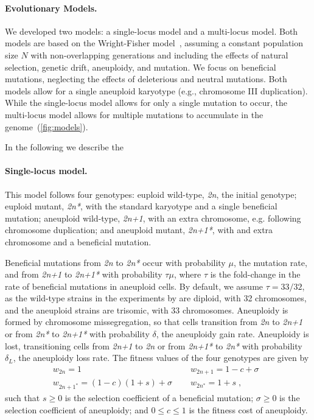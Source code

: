 \documentclass[12pt]{extarticle}
\newcommand{\euwt}{\emph{2n}}
\newcommand{\anwt}{\emph{2n+1}}
\newcommand{\eumt}{\emph{2n*}}
\newcommand{\anmt}{\emph{2n+1*}}
\begin{document}
\paragraph*{Evolutionary Models.}
We developed two models: a single-locus model and a multi-locus model. 
Both models are based on the Wright-Fisher model~\citep{Otto2007}, assuming a constant population size $N$ with non-overlapping generations and including the effects of natural selection, genetic drift, aneuploidy, and mutation.
We focus on beneficial mutations, neglecting the effects of deleterious and neutral mutations. Both models allow for a single aneuploid karyotype (e.g., chromosome III duplication).
While the single-locus model allows for only a single mutation to occur, the
multi-locus model allows for multiple mutations to accumulate in the genome~(\autoref{fig:models}).

In the following we describe the 

\paragraph*{Single-locus model.}
This model follows four genotypes: euploid wild-type, \euwt, the initial genotype; 
euploid mutant, \eumt, with the standard karyotype and a single beneficial mutation; 
aneuploid wild-type, \anwt, with an extra chromosome, e.g. following chromosome duplication; and
aneuploid mutant, \anmt, with and extra chromosome and a beneficial mutation. 

Beneficial mutations from \euwt\; to \eumt\; occur with probability $\mu$, the mutation rate, and from \anwt\; to \anmt\; with probability $\tau \mu$, where $\tau$ is the fold-change in the rate of beneficial mutations in aneuploid cells. By default, we assume $\tau=33/32$, as the wild-type \yeast strains in the experiments by \citep{Yona2012} are diploid, with 32 chromosomes, and the aneuploid strains are trisomic, with 33 chromosomes.
Aneuploidy is formed by chromosome missegregation, so that cells transition from \euwt\; to \anwt\; or from \eumt\; to \anmt\; with probability $\delta$, the aneuploidy gain rate.
Aneuploidy is lost, transitioning cells from \anwt\; to \euwt\; or from \anmt\; to \eumt\; with probability $\delta_L$, the aneuploidy loss rate.
The fitness values of the four genotypes are given by
\begin{equation} \label{eq:fitness-single}
\begin{aligned}
&w_{2n}  = 1 \;\;&
&w_{2n+1}  = 1-c+\sigma \;\;&
\\
&w_{2n+1^*}  = (1-c)(1+s)+\sigma \;\;&
&w_{2n^*}  = 1+s \;,\;&
\end{aligned}
\end{equation}
such that $s \ge 0$ is the selection coefficient of a beneficial mutation;
$\sigma \ge 0$ is the selection coefficient of aneuploidy; 
and $0 \le c \le 1$ is the fitness cost of aneuploidy.
\end{document}
